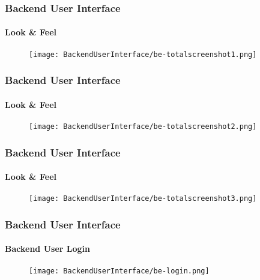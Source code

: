 \begin{frame}[fragile]
	\frametitle{Backend User Interface}
	\framesubtitle{Look \& Feel}

	\begin{figure}
		\texttt{[image: BackendUserInterface/be-totalscreenshot1.png]}
	\end{figure}

\end{frame}


\begin{frame}[fragile]
	\frametitle{Backend User Interface}
	\framesubtitle{Look \& Feel}

	\begin{figure}
		\texttt{[image: BackendUserInterface/be-totalscreenshot2.png]}
	\end{figure}

\end{frame}


\begin{frame}[fragile]
	\frametitle{Backend User Interface}
	\framesubtitle{Look \& Feel}

	\begin{figure}
		\texttt{[image: BackendUserInterface/be-totalscreenshot3.png]}
	\end{figure}

\end{frame}


\begin{frame}[fragile]
	\frametitle{Backend User Interface}
	\framesubtitle{Backend User Login}

	\begin{figure}
		\texttt{[image: BackendUserInterface/be-login.png]}
	\end{figure}

\end{frame}

